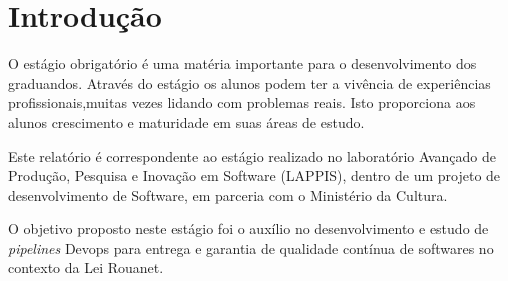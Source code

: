 \chapter[Introdução]{Introdução}

O estágio obrigatório é uma matéria importante para o desenvolvimento dos graduandos. Através do estágio os alunos podem ter a vivência de experiências profissionais,muitas vezes lidando com problemas reais. Isto proporciona aos alunos crescimento e maturidade em suas áreas de estudo.

Este relatório é correspondente ao estágio realizado no laboratório Avançado de Produção, Pesquisa e Inovação em Software (LAPPIS), dentro de um projeto de desenvolvimento de Software, em parceria com o Ministério da Cultura.

O objetivo proposto neste estágio foi o auxílio no desenvolvimento e estudo de \textit{pipelines} Devops para entrega e garantia de qualidade contínua de softwares no contexto da Lei Rouanet.
